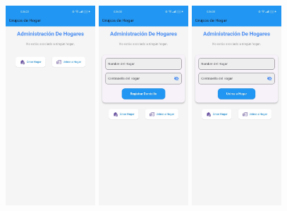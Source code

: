 \documentclass{article}
\begin{document}
\begin{flushleft}
\begin{figure}[H]
       \includegraphics[width=0.3\textwidth]{TFG/img/img/hogar1.jpeg}
     \includegraphics[width=0.3\textwidth]{TFG/img/img/hogar.jpeg}
          \includegraphics[width=0.3\textwidth]{TFG/img/img/unirse.jpeg}


\end{figure}
\end{flushleft}
\end{document}
